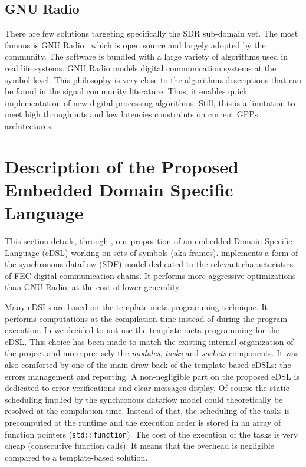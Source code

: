\subsection{GNU Radio}

There are few solutions targeting specifically the SDR sub-domain yet. The most
famous is GNU Radio~\cite{GNURadio} which is open source and largely adopted by
the community. The software is bundled with a large variety of algorithms used
in real life systems. GNU Radio models digital communication systems at the
symbol level. This philosophy is very close to the algorithms descriptions that
can be found in the signal community literature. Thus, it enables quick
implementation of new digital processing algorithms. Still, this is a limitation
to meet high throughputs and low latencies constraints on current GPPs
architectures.

\section{Description of the Proposed Embedded Domain Specific Language}

This section details, through \AFFECT, our proposition of an embedded Domain
Specific Language (eDSL) working on sets of symbols (aka frames). \AFFECT
implements a form of the synchronous dataflow (SDF) model dedicated to the
relevant characteristics of FEC digital communication chains. It performs more
aggressive optimizations than GNU Radio, at the cost of lower generality.

Many \Cxx eDSLs are based on the template meta-programming technique. It
performs computations at the compilation time instead of during the program
execution. In \AFFECT we decided to not use the \Cxx template meta-programming
for the eDSL. This choice has been made to match the existing internal
organization of the project and more precisely the \emph{modules}, \emph{tasks}
and \emph{sockets} components. It was also comforted by one of the main draw
back of the template-based eDSLs: the errors management and reporting. A
non-negligible part on the proposed eDSL is dedicated to error verifications and
clear messages display. Of course the static scheduling implied by the
synchronous dataflow model could theoretically be resolved at the compilation
time. Instead of that, the scheduling of the tasks is precomputed at the runtime
and the execution order is stored in an array of function pointers
(\verb|std::function|). The cost of the execution of the tasks is very cheap
(consecutive function calls). It means that the overhead is negligible compared
to a template-based solution.


